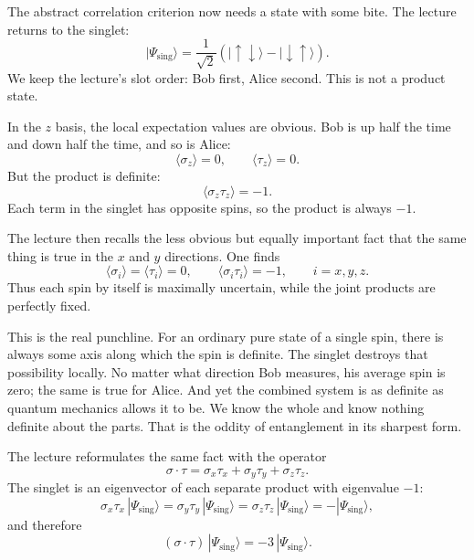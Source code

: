 The abstract correlation criterion now needs a state with some bite. The lecture returns to the singlet:
\begin{equation}
|\Psi_{\mathrm{sing}}\rangle
=
\frac{1}{\sqrt2}
\left(
|\uparrow\downarrow\rangle
-
|\downarrow\uparrow\rangle
\right).
\end{equation}
We keep the lecture's slot order: Bob first, Alice second. This is not a product state.

In the $z$ basis, the local expectation values are obvious. Bob is up half the time and down half the time, and so is Alice:
\begin{equation}
\langle \sigma_z\rangle=0,
\qquad
\langle \tau_z\rangle=0.
\end{equation}
But the product is definite:
\begin{equation}
\langle \sigma_z\tau_z\rangle=-1.
\end{equation}
Each term in the singlet has opposite spins, so the product is always $-1$.

The lecture then recalls the less obvious but equally important fact that the same thing is true in the $x$ and $y$ directions. One finds
\begin{equation}
\langle \sigma_i\rangle=\langle \tau_i\rangle=0,
\qquad
\langle \sigma_i\tau_i\rangle=-1,
\qquad
i=x,y,z.
\end{equation}
Thus each spin by itself is maximally uncertain, while the joint products are perfectly fixed.

This is the real punchline. For an ordinary pure state of a single spin, there is always some axis along which the spin is definite. The singlet destroys that possibility locally. No matter what direction Bob measures, his average spin is zero; the same is true for Alice. And yet the combined system is as definite as quantum mechanics allows it to be. We know the whole and know nothing definite about the parts. That is the oddity of entanglement in its sharpest form.

The lecture reformulates the same fact with the operator
\begin{equation}
\sigma\!\cdot\!\tau
=
\sigma_x\tau_x+\sigma_y\tau_y+\sigma_z\tau_z.
\end{equation}
The singlet is an eigenvector of each separate product with eigenvalue $-1$:
\begin{equation}
\sigma_x\tau_x\,|\Psi_{\mathrm{sing}}\rangle
=
\sigma_y\tau_y\,|\Psi_{\mathrm{sing}}\rangle
=
\sigma_z\tau_z\,|\Psi_{\mathrm{sing}}\rangle
=
-|\Psi_{\mathrm{sing}}\rangle,
\end{equation}
and therefore
\begin{equation}
(\sigma\!\cdot\!\tau)\,|\Psi_{\mathrm{sing}}\rangle
=
-3\,|\Psi_{\mathrm{sing}}\rangle.
\end{equation}

